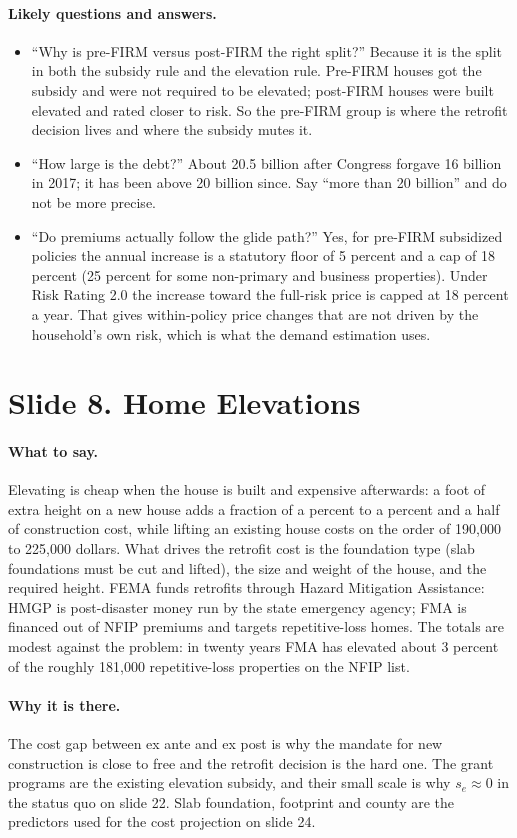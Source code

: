 \documentclass[11pt]{article}
\newcommand{\slide}[2]{\section*{Slide #1. #2}\addcontentsline{toc}{section}{Slide #1. #2}}
\newcommand{\say}{\paragraph{What to say.}}
\newcommand{\why}{\paragraph{Why it is there.}}
\newcommand{\qa}{\paragraph{Likely questions and answers.}}
\begin{document}
\qa
\begin{itemize}
\item ``Why is pre-FIRM versus post-FIRM the right split?'' Because it is the split in both the subsidy rule and the elevation rule. Pre-FIRM houses got the subsidy and were not required to be elevated; post-FIRM houses were built elevated and rated closer to risk. So the pre-FIRM group is where the retrofit decision lives and where the subsidy mutes it.
\item ``How large is the debt?'' About 20.5 billion after Congress forgave 16 billion in 2017; it has been above 20 billion since. Say ``more than 20 billion'' and do not be more precise.
\item ``Do premiums actually follow the glide path?'' Yes, for pre-FIRM subsidized policies the annual increase is a statutory floor of 5 percent and a cap of 18 percent (25 percent for some non-primary and business properties). Under Risk Rating 2.0 the increase toward the full-risk price is capped at 18 percent a year. That gives within-policy price changes that are not driven by the household's own risk, which is what the demand estimation uses.
\end{itemize}

\slide{8}{Home Elevations}
\say Elevating is cheap when the house is built and expensive afterwards: a foot of extra height on a new house adds a fraction of a percent to a percent and a half of construction cost, while lifting an existing house costs on the order of 190,000 to 225,000 dollars. What drives the retrofit cost is the foundation type (slab foundations must be cut and lifted), the size and weight of the house, and the required height. FEMA funds retrofits through Hazard Mitigation Assistance: HMGP is post-disaster money run by the state emergency agency; FMA is financed out of NFIP premiums and targets repetitive-loss homes. The totals are modest against the problem: in twenty years FMA has elevated about 3 percent of the roughly 181,000 repetitive-loss properties on the NFIP list.

\why The cost gap between ex ante and ex post is why the mandate for new construction is close to free and the retrofit decision is the hard one. The grant programs are the existing elevation subsidy, and their small scale is why $s_e \approx 0$ in the status quo on slide 22. Slab foundation, footprint and county are the predictors used for the cost projection on slide 24.
\end{document}
